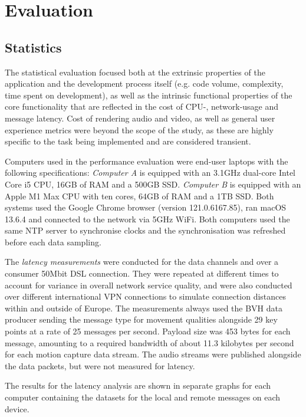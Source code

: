 \chapter{Evaluation}
\label{ch:evaluation}


\section{Statistics}
\label{sec:statistics}

The statistical evaluation focused both at the extrinsic properties of the application and the development process itself (e.g. code volume, complexity, time spent on development), as well as the intrinsic functional properties of the core functionality that are reflected in the cost of \ac{CPU}-, network-usage and message latency.
Cost of rendering audio and video, as well as general user experience metrics were beyond the scope of the study, as these are highly specific to the task being implemented and are considered transient.

Computers used in the performance evaluation were end-user laptops with the following specifications: \emph{Computer A} is equipped with an 3.1GHz dual-core Intel Core i5 \ac{CPU}, 16GB of \ac{RAM} and a 500GB \ac{SSD}.
\emph{Computer B} is equipped with an Apple M1 Max \ac{CPU} with ten cores, 64GB of \ac{RAM} and a 1TB \ac{SSD}.
Both systems used the Google Chrome browser (version 121.0.6167.85), ran macOS 13.6.4 and connected to the network via 5GHz WiFi.
Both computers used the same \ac{NTP} server to synchronise clocks and the synchronisation was refreshed before each data sampling.

The \emph{latency measurements} were conducted for the data channels and over a consumer 50Mbit \ac{DSL} connection.
They were repeated at different times to account for variance in overall network service quality, and were also conducted over different international \ac{VPN} connections to simulate connection distances within and outside of Europe.
The measurements always used the \ac{BVH} data producer sending the message type for movement qualities alongside 29 key points at a rate of 25 messages per second.
Payload size was 453 bytes for each message, amounting to a required bandwidth of about 11.3 kilobytes per second for each motion capture data stream.
The audio streams were published alongside the data packets, but were not measured for latency.

The results for the latency analysis are shown in separate graphs for each computer containing the datasets for the local and remote messages on each device.

